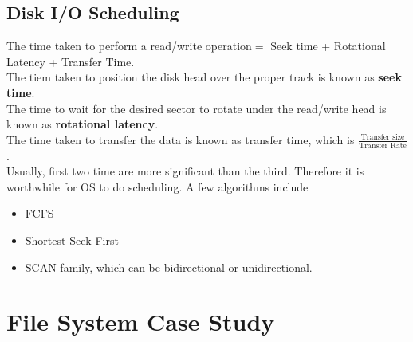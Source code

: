 \documentclass[12pt]{article}
\theoremstyle{definition}
\begin{document}
\subsection{Disk I/O Scheduling}
The time taken to perform a read/write operation$=$ Seek time + Rotational Latency + Transfer Time.\\
The tiem taken to position the disk head over the proper track is known as \textbf{seek time}.\\
The time to wait for the desired sector to rotate under the read/write head is known as \textbf{rotational latency}.\\
The time taken to transfer the data is known as transfer time, which is $\frac{\text{Transfer size}}{\text{Transfer Rate}}$.\\
Usually, first two time are more significant than the third. Therefore it is worthwhile for OS to do scheduling. 
A few algorithms include
\begin{itemize}
  \item FCFS
  \item Shortest Seek First
  \item SCAN family, which can be bidirectional or unidirectional.
\end{itemize}

\section{File System Case Study}
\end{document}
